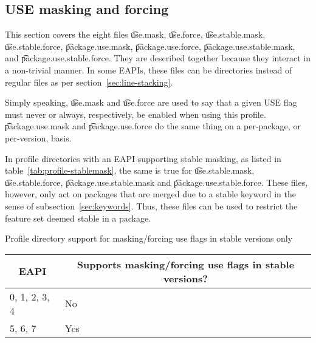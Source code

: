 \subsection{USE masking and forcing}
\label{sec:use-masking}
This section covers the eight files \t{use.mask}, \t{use.force}, \t{use.stable.mask},
\t{use.stable.force}, \t{package.use.mask}, \t{package.use.force}, \t{package.use.stable.mask},
and \t{package.use.\allowbreak stable.force}. They are described together because they interact in
a non-trivial manner. In some EAPIs, these files can be directories instead of regular files as per
section~\ref{sec:line-stacking}.

Simply speaking, \t{use.mask} and \t{use.force} are used to say that a given USE flag must never or
always, respectively, be enabled when using this profile. \t{package.use.mask} and
\t{package.use.force} do the same thing on a per-package, or per-version, basis.

In profile directories with an EAPI supporting stable masking, as listed in
table~\ref{tab:profile-stablemask}, the same is true for \t{use.stable.mask}, \t{use.stable.force},
\t{package.use.stable.mask} and \t{package.use.\allowbreak stable.force}. These files, however,
only act on packages that are merged due to a stable keyword in the sense of
subsection~\ref{sec:keywords}. Thus, these files can be used to restrict the feature set deemed
stable in a package.

\begin{centertable}{Profile directory support for masking/forcing use flags in stable versions only}
    \label{tab:profile-stablemask}
    \begin{tabular}{ll}
      \toprule
      \multicolumn{1}{c}{\textbf{EAPI}} &
      \multicolumn{1}{c}{\textbf{Supports masking/forcing use flags in stable versions?}} \\
      \midrule
      0, 1, 2, 3, 4     & No  \\
      5, 6, 7           & Yes \\
      \bottomrule
    \end{tabular}
\end{centertable}

